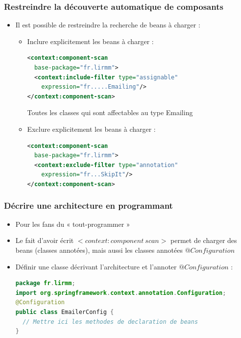 \documentclass{beamer}
\begin{document}
\begin{frame}[fragile]
  \frametitle{Restreindre la découverte automatique de composants}
  \begin{itemize}
  \item Il est possible de restreindre la recherche de beans à charger :
  \begin{itemize}
  \item Inclure explicitement les beans à charger :
\begin{lstlisting}[language=XML,basicstyle=\scriptsize]          
<context:component-scan
  base-package="fr.lirmm">
  <context:include-filter type="assignable"
    expression="fr.....Emailing"/>
</context:component-scan>
\end{lstlisting}
Toutes les classes qui sont affectables au type Emailing
\item Exclure explicitement les beans à charger :
\begin{lstlisting}[language=XML,basicstyle=\scriptsize]          
<context:component-scan
  base-package="fr.lirmm">
  <context:exclude-filter type="annotation"
    expression="fr...SkipIt"/>
</context:component-scan>
\end{lstlisting}
\end{itemize}
\end{itemize}
\end{frame}

\begin{frame}[fragile]
  \frametitle{Décrire une architecture en programmant}
  \begin{itemize}
  \item Pour les fans du « tout-programmer »
  \item Le fait d'avoir écrit $<context:component~scan>$ permet de
    charger des beans (classes annotées), mais aussi les classes
    annotées $@Configuration$
  \item Définir une classe décrivant
    l'architecture et l'annoter $@Configuration$ :
\begin{lstlisting}[language=Java,basicstyle=\scriptsize]          
package fr.lirmm;
import org.springframework.context.annotation.Configuration;
@Configuration
public class EmailerConfig {
  // Mettre ici les methodes de declaration de beans
}
\end{lstlisting}
\end{itemize}
\end{frame}
\end{document}
